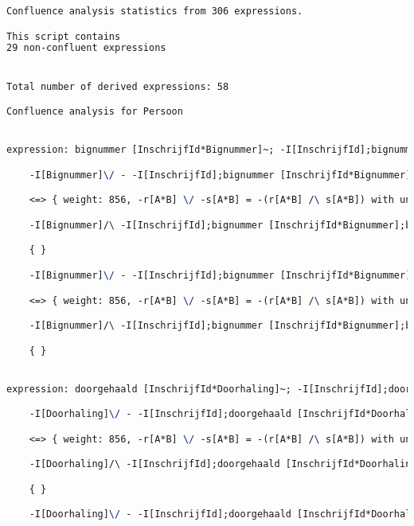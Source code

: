 \begin{lstlisting}[language=TeX]
Confluence analysis statistics from 306 expressions.

This script contains
29 non-confluent expressions


Total number of derived expressions: 58

Confluence analysis for Persoon


expression: bignummer [InschrijfId*Bignummer]~; -I[InschrijfId];bignummer [InschrijfId*Bignummer] |- -I[Bignummer]

    -I[Bignummer]\/ - -I[InschrijfId];bignummer [InschrijfId*Bignummer];bignummer [InschrijfId*Bignummer]~

    <=> { weight: 856, -r[A*B] \/ -s[A*B] = -(r[A*B] /\ s[A*B]) with unifier: {A->I[Bignummer], B->I[Bignummer], r->bignummer [InschrijfId*Bignummer]~;-I[InschrijfId];bignummer [InschrijfId*Bignummer], s->I[Bignummer]} }

    -I[Bignummer]/\ -I[InschrijfId];bignummer [InschrijfId*Bignummer];bignummer [InschrijfId*Bignummer]~

    { }

    -I[Bignummer]\/ - -I[InschrijfId];bignummer [InschrijfId*Bignummer];bignummer [InschrijfId*Bignummer]~

    <=> { weight: 856, -r[A*B] \/ -s[A*B] = -(r[A*B] /\ s[A*B]) with unifier: {A->I[Bignummer], B->I[Bignummer], r->I[Bignummer], s->bignummer [InschrijfId*Bignummer]~;-I[InschrijfId];bignummer [InschrijfId*Bignummer]} }

    -I[Bignummer]/\ -I[InschrijfId];bignummer [InschrijfId*Bignummer];bignummer [InschrijfId*Bignummer]~

    { }


expression: doorgehaald [InschrijfId*Doorhaling]~; -I[InschrijfId];doorgehaald [InschrijfId*Doorhaling] |- -I[Doorhaling]

    -I[Doorhaling]\/ - -I[InschrijfId];doorgehaald [InschrijfId*Doorhaling];doorgehaald [InschrijfId*Doorhaling]~

    <=> { weight: 856, -r[A*B] \/ -s[A*B] = -(r[A*B] /\ s[A*B]) with unifier: {A->I[Doorhaling], B->I[Doorhaling], r->doorgehaald [InschrijfId*Doorhaling]~;-I[InschrijfId];doorgehaald [InschrijfId*Doorhaling], s->I[Doorhaling]} }

    -I[Doorhaling]/\ -I[InschrijfId];doorgehaald [InschrijfId*Doorhaling];doorgehaald [InschrijfId*Doorhaling]~

    { }

    -I[Doorhaling]\/ - -I[InschrijfId];doorgehaald [InschrijfId*Doorhaling];doorgehaald [InschrijfId*Doorhaling]~


\end{lstlisting}
